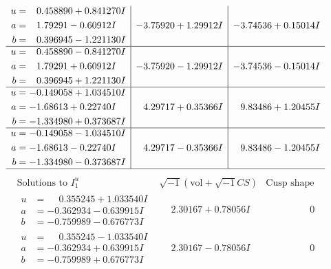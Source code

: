 \documentclass[1p]{elsarticle_modified}
\theoremstyle{definition}
\newcommand{\I}{\sqrt{-1}}
\begin{document}
$$\begin{array}{c|c|c}
\begin{aligned}
u &= \phantom{-}0.458890 + 0.841270 I \\
a &= \phantom{-}1.79291 - 0.60912 I \\
b &= \phantom{-}0.396945 - 1.221130 I\end{aligned}
 & -3.75920 + 1.29912 I & -3.74536 + 0.15014 I \\ \hline\begin{aligned}
u &= \phantom{-}0.458890 - 0.841270 I \\
a &= \phantom{-}1.79291 + 0.60912 I \\
b &= \phantom{-}0.396945 + 1.221130 I\end{aligned}
 & -3.75920 - 1.29912 I & -3.74536 - 0.15014 I \\ \hline\begin{aligned}
u &= -0.149058 + 1.034510 I \\
a &= -1.68613 + 0.22740 I \\
b &= -1.334980 + 0.373687 I\end{aligned}
 & \phantom{-}4.29717 + 0.35366 I & \phantom{-}9.83486 + 1.20455 I \\ \hline\begin{aligned}
u &= -0.149058 - 1.034510 I \\
a &= -1.68613 - 0.22740 I \\
b &= -1.334980 - 0.373687 I\end{aligned}
 & \phantom{-}4.29717 - 0.35366 I & \phantom{-}9.83486 - 1.20455 I\\
 \hline 
 \end{array}$$\newpage$$\begin{array}{c|c|c}  
\text{Solutions to }I^u_{1}& \I (\text{vol} + \sqrt{-1}CS) & \text{Cusp shape}\\
 \hline 
\begin{aligned}
u &= \phantom{-}0.355245 + 1.033540 I \\
a &= -0.362934 - 0.639915 I \\
b &= -0.759989 - 0.676773 I\end{aligned}
 & \phantom{-}2.30167 + 0.78056 I & \phantom{-0.000000 } 0 \\ \hline\begin{aligned}
u &= \phantom{-}0.355245 - 1.033540 I \\
a &= -0.362934 + 0.639915 I \\
b &= -0.759989 + 0.676773 I\end{aligned}
 & \phantom{-}2.30167 - 0.78056 I & \phantom{-0.000000 } 0 \\ \hline\begin{aligned}

\end{aligned}
\end{array}$$
\end{document}
